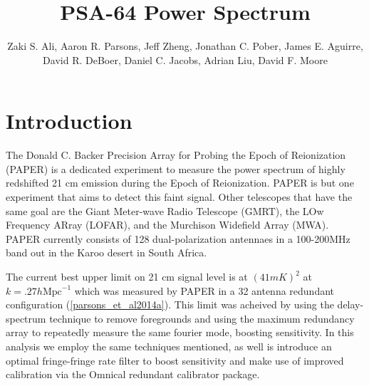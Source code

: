 \documentclass[twocolumn,numberedappendix]{emulateapj}
\begin{document}
\title{PSA-64 Power Spectrum}

\author{
Zaki S. Ali,
Aaron R. Parsons,
Jeff Zheng,
Jonathan C. Pober,
James E. Aguirre,
David R. DeBoer,
Daniel C. Jacobs,
Adrian Liu,
David F. Moore
}


\begin{abstract}
\end{abstract}


\section{Introduction}
The Donald C. Backer Precision Array for Probing the Epoch of Reionization
(PAPER) is a dedicated experiment to measure the power spectrum of highly
redshifted 21 cm emission during the Epoch of Reionization. PAPER is but one
experiment that aims to detect this faint signal. Other telescopes that have the
same goal are the Giant Meter-wave Radio Telescope (GMRT), the LOw Frequency
ARray (LOFAR), and the Murchison Widefield Array (MWA). PAPER currently consists
of 128 dual-polarization antennaes in a 100-200MHz band out in the Karoo desert
in South Africa. 

The current best upper limit on 21 cm signal level is at $(41 mK)^{2}$ at
$k=.27 h \text{Mpc}^{-1}$ which was measured by PAPER in a 32 antenna redundant
configuration (\ref{parsons_et_al2014a}). This limit was acheived by using the
delay-spectrum technique to remove foregrounds and using the  maximum
redundancy array to repeatedly measure the same fourier mode, boosting
sensitivity. In this analysis we employ the same techniques mentioned, as well
is introduce an optimal fringe-fringe rate filter to  boost sensitivity and
make use of improved calibration via the Omnical redundant calibrator package. 
\end{document}
